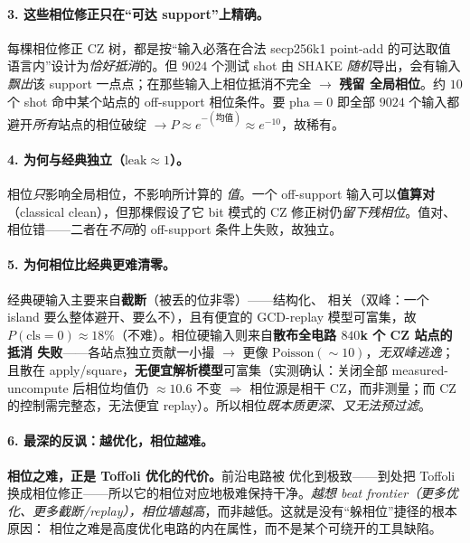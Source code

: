 \documentclass[11pt]{ctexart}
\begin{document}
\paragraph{3. 这些相位修正只在``可达 support''上精确。}每棵相位修正 CZ 树，都是按``输入必落在合法
secp256k1 point-add 的可达取值语言内''设计为\emph{恰好抵消}的。但 $9024$ 个测试 shot 由 SHAKE
\emph{随机}导出，会有输入\emph{飘出}该 support 一点点；在那些输入上相位抵消不完全 $\to$ \textbf{残留
全局相位}。约 $10$ 个 shot 命中某个站点的 off-support 相位条件。要 $\text{pha}{=}0$ 即全部 $9024$
个输入都避开\emph{所有}站点的相位破绽 $\to P\approx e^{-(\text{均值})}\approx e^{-10}$，故稀有。

\paragraph{4. 为何与经典独立（$\text{leak}\approx 1$）。}相位\emph{只}影响全局相位，不影响所计算的
\emph{值}。一个 off-support 输入可以\textbf{值算对}（classical clean），但那棵假设了它 bit 模式的 CZ
修正树仍\emph{留下残相位}。值对、相位错——二者在\emph{不同}的 off-support 条件上失败，故独立。

\paragraph{5. 为何相位比经典更难清零。}经典硬输入主要来自\textbf{截断}（被丢的位非零）——结构化、
相关（双峰：一个 island 要么整体避开、要么不），且有便宜的 GCD-replay 模型可富集，故
$P(\text{cls}{=}0)\approx 18\%$（不难）。相位硬输入则来自\textbf{散布全电路 $840$k 个 CZ 站点的抵消
失败}——各站点独立贡献一小撮 $\to$ 更像 $\text{Poisson}(\sim 10)$，\emph{无双峰逃逸}；且散在
apply/square，\textbf{无便宜解析模型}可富集（实测确认：关闭全部 measured-uncompute 后相位均值仍
$\approx 10.6$ 不变 $\Rightarrow$ 相位源是相干 CZ，而非测量；而 CZ 的控制需完整态，无法便宜
replay）。所以相位\emph{既本质更深、又无法预过滤}。

\paragraph{6. 最深的反讽：越优化，相位越难。}\textbf{相位之难，正是 Toffoli 优化的代价。}前沿电路被
优化到极致——到处把 Toffoli 换成相位修正——所以它的相位对应地极难保持干净。\emph{越想 beat
frontier（更多优化、更多截断/replay），相位墙越高}，而非越低。这就是没有``躲相位''捷径的根本原因：
相位之难是高度优化电路的内在属性，而不是某个可绕开的工具缺陷。

\end{document}
